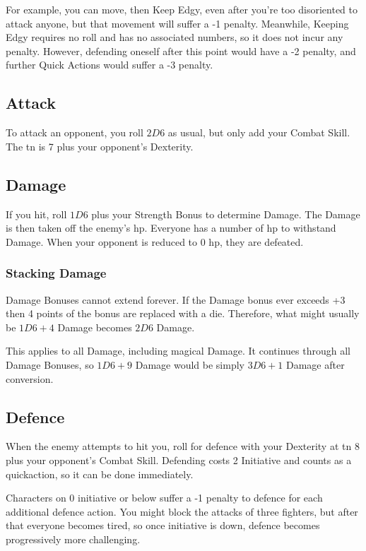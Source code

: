 \begin{multicols}{2}
For example, you can move, then Keep Edgy, even after you're too disoriented to attack anyone, but that movement will suffer a -1 penalty.
Meanwhile, Keeping Edgy requires no roll and has no associated numbers, so it does not incur any penalty.
However, defending oneself after this point would have a -2 penalty, and further Quick Actions would suffer a -3 penalty.

\subsection{Attack}

To attack an opponent, you roll $2D6$ as usual, but only add your Combat Skill.
The \gls{tn} is 7 plus your opponent's Dexterity.

\subsection{Damage}

If you hit, roll $1D6$ plus your Strength Bonus to determine Damage.
The Damage is then taken off the enemy's \gls{hp}.
Everyone has a number of \gls{hp} to withstand Damage. When your opponent is reduced to 0 \gls{hp}, they are defeated.

\subsubsection{Stacking Damage}

Damage Bonuses cannot extend forever. If the Damage bonus ever exceeds +3 then 4 points of the bonus are replaced with a die. Therefore, what might usually be $1D6+4$ Damage becomes $2D6$ Damage.

This applies to all Damage, including magical Damage. It continues through all Damage Bonuses, so $1D6+9$ Damage would be simply $3D6+1$ Damage after conversion.

\subsection{Defence}

When the enemy attempts to hit you, roll for defence with your Dexterity at \gls{tn} 8 plus your opponent's Combat Skill.
Defending costs 2 Initiative and counts as a \gls{quickaction}, so it can be done immediately.

Characters on 0 initiative or below suffer a -1 penalty to defence for each additional defence action.
You might block the attacks of three fighters, but after that everyone becomes tired, so once initiative is down, defence becomes progressively more challenging.


\end{multicols}
